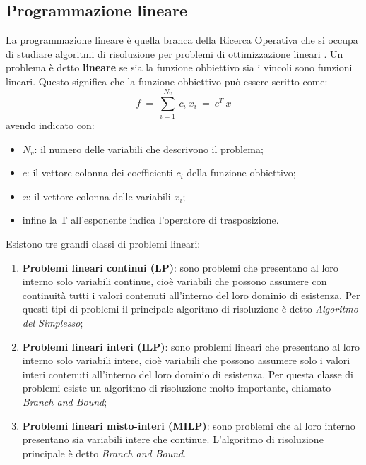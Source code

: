 \subsection{Programmazione lineare}
La programmazione lineare è quella branca della Ricerca Operativa che si occupa di studiare algoritmi di risoluzione per problemi di ottimizzazione lineari \cite{ref:IntroMatProg}.
Un problema è detto \textbf{lineare} se sia la funzione obbiettivo sia i vincoli sono funzioni lineari. Questo significa che la funzione obbiettivo può essere scritto come:
\begin{equation}
f ~ = ~ \sum_{i=1}^{N_v} ~ c_i ~ x_i ~ = ~ c^T ~ x 
\end{equation}
avendo indicato con:
\begin{itemize}
\item $N_v$: il numero delle variabili che descrivono il problema;
\item $c$: il vettore colonna dei coefficienti $c_i$ della funzione obbiettivo;
\item $x$: il vettore colonna delle variabili $x_i$;
\item infine la T all'esponente indica l'operatore di trasposizione.
\end{itemize}

Esistono tre grandi classi di problemi lineari:
\begin{enumerate}
\item \textbf{Problemi lineari continui (LP)}: sono problemi che presentano al loro interno solo variabili continue, cioè variabili che possono assumere con continuità tutti i valori contenuti all'interno del loro dominio di esistenza.
Per questi tipi di problemi il principale algoritmo di risoluzione è detto \textit{Algoritmo del Simplesso};
\item \textbf{Problemi lineari interi (ILP)}: sono problemi lineari che presentano al loro interno solo variabili intere, cioè variabili che possono assumere solo i valori interi contenuti all'interno del loro dominio di esistenza.
Per questa classe di problemi esiste un algoritmo di risoluzione molto importante, chiamato \textit{Branch and Bound};
\item \textbf{Problemi lineari misto-interi (MILP)}: sono problemi che al loro interno presentano sia variabili intere che continue. L'algoritmo di risoluzione principale è detto \textit{Branch and Bound}.
\end{enumerate}


